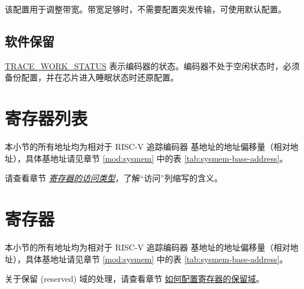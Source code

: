 \documentclass[main\_\_CN.tex]{subfiles}
\begin{document}
该配置用于调整带宽。带宽足够时，不需要配置突发传输，可使用默认配置。

\subsection{软件保留}

\hyperref[fielddesc:TRACEWORKSTATUS]{TRACE\_WORK\_STATUS} 表示编码器的状态。编码器不处于空闲状态时，必须备份配置，并在芯片进入睡眠状态时还原配置。




\newpage
\hypertarget{riscvtracenc-reg-summ}{}
\section{寄存器列表}
\label{sec:riscvtracenc-reg-summ}

本小节的所有地址均为相对于 RISC-V 追踪编码器 基地址的地址偏移量（相对地址），具体基地址请见章节 \ref{mod:sysmem} \textit{} 中的表 \ref{tab:sysmem-base-address}。

请查看章节 \hyperref[glossary-access-types]{\textit{寄存器的访问类型}}，了解“访问”列缩写的含义。






\newpage
\section{寄存器}

本小节的所有地址均为相对于 RISC-V 追踪编码器 基地址的地址偏移量（相对地址），具体基地址请见章节 \ref{mod:sysmem} \textit{} 中的表 \ref{tab:sysmem-base-address}。

关于保留 (reserved) 域的处理，请查看章节 \hyperref[programming-reserved-field]{如何配置寄存器的保留域}。


\end{document}
